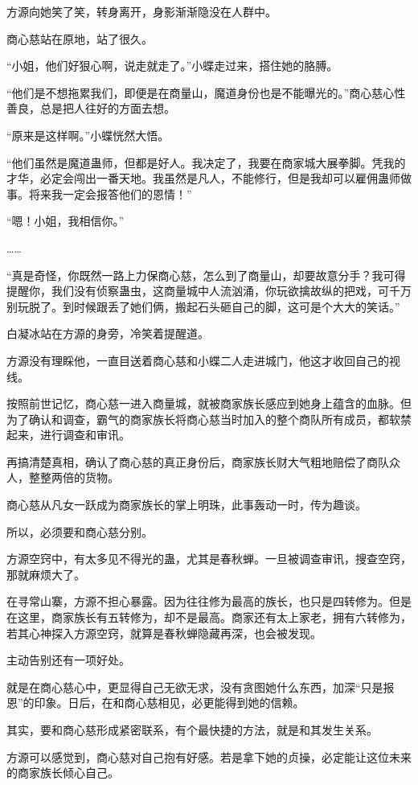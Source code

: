 \begin{this_body}
方源向她笑了笑，转身离开，身影渐渐隐没在人群中。

商心慈站在原地，站了很久。

“小姐，他们好狠心啊，说走就走了。”小蝶走过来，搭住她的胳膊。

“他们是不想拖累我们，即便是在商量山，魔道身份也是不能曝光的。”商心慈心性善良，总是把人往好的方面去想。

“原来是这样啊。”小蝶恍然大悟。

“他们虽然是魔道蛊师，但都是好人。我决定了，我要在商家城大展拳脚。凭我的才华，必定会闯出一番天地。我虽然是凡人，不能修行，但是我却可以雇佣蛊师做事。将来我一定会报答他们的恩情！”

“嗯！小姐，我相信你。”

……

“真是奇怪，你既然一路上力保商心慈，怎么到了商量山，却要故意分手？我可得提醒你，我们没有侦察蛊虫，这商量城中人流汹涌，你玩欲擒故纵的把戏，可千万别玩脱了。到时候跟丢了她们俩，搬起石头砸自己的脚，这可是个大大的笑话。”

白凝冰站在方源的身旁，冷笑着提醒道。

方源没有理睬他，一直目送着商心慈和小蝶二人走进城门，他这才收回自己的视线。

按照前世记忆，商心慈一进入商量城，就被商家族长感应到她身上蕴含的血脉。但为了确认和调查，霸气的商家族长将商心慈当时加入的整个商队所有成员，都软禁起来，进行调查和审讯。

再搞清楚真相，确认了商心慈的真正身份后，商家族长财大气粗地赔偿了商队众人，整整两倍的货物。

商心慈从凡女一跃成为商家族长的掌上明珠，此事轰动一时，传为趣谈。

所以，必须要和商心慈分别。

方源空窍中，有太多见不得光的蛊，尤其是春秋蝉。一旦被调查审讯，搜查空窍，那就麻烦大了。

在寻常山寨，方源不担心暴露。因为往往修为最高的族长，也只是四转修为。但是在这里，商家族长有五转修为，却不是最高。商家还有太上家老，拥有六转修为，若其心神探入方源空窍，就算是春秋蝉隐藏再深，也会被发现。

主动告别还有一项好处。

就是在商心慈心中，更显得自己无欲无求，没有贪图她什么东西，加深“只是报恩”的印象。日后，在和商心慈相见，必更能得到她的信赖。

其实，要和商心慈形成紧密联系，有个最快捷的方法，就是和其发生关系。

方源可以感觉到，商心慈对自己抱有好感。若是拿下她的贞操，必定能让这位未来的商家族长倾心自己。


\end{this_body}
